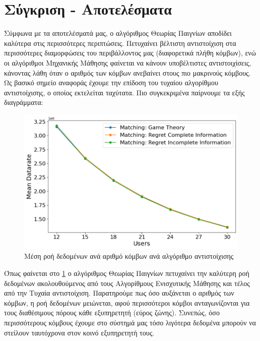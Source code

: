 \section{Σύγκριση - Αποτελέσματα}

Σύμφωνα με τα αποτελέσματά μας, ο αλγόριθμος Θεωρίας Παιγνίων αποδίδει καλύτερα στις περισσότερες περιπτώσεις. Πετυχαίνει βέλτιστη αντιστοίχιση στα περισσότερες διαμορφώσεις του περιβάλλοντος μας (διαφορετικά πλήθη κόμβων), ενώ οι αλγόριθμοι Μηχανικής Μάθησης φαίνεται να κάνουν υποβέλτιστες αντιστοιχίσεις, κάνοντας λάθη όταν ο αριθμός των κόμβων ανεβαίνει στους πιο μακρινούς κόμβους. Ως βασικό σημείο αναφοράς έχουμε την επίδοση του τυχαίου αλγορίθμου αντιστοίχισης, ο οποίος εκτελείται ταχύτατα.  Πιο συγκεκριμένα παίρνουμε τα εξής διαγράμματα:

\begin{figure}[H]
    \centering
    \includegraphics[width=\textwidth]{figures/chapter4/Mean_Datarate_vs_Users.png}
    \caption{Μέση ροή δεδομένων ανά αριθμό κόμβων ανά αλγόριθμο αντιστοίχισης}
    \label{fig7}
\end{figure}

Όπως φαίνεται στο \ref{fig7} ο αλγόριθμος Θεωρίας Παιγνίων πετυχαίνει την καλύτερη ροή δεδομένων ακολουθούμενος από τους Αλγορίθμους Ενισχυτικής Μάθησης και τέλος από την Τυχαία αντιστοίχιση. Παρατηρούμε πως όσο αυξάνεται ο αριθμός των κόμβων, η ροή δεδομένων μειώνεται, αφού περισσότεροι κόμβοι ανταγωνίζονται για τους διαθέσιμους πόρους κάθε εξυπηρετητή (εύρος ζώνης). Συνεπώς, όσο περισσότερους κόμβους έχουμε στο σύστημά μας τόσο λιγότερα δεδομένα μπορούν να στείλουν ταυτόχρονα στον κοινό εξυπηρετητή τους.

